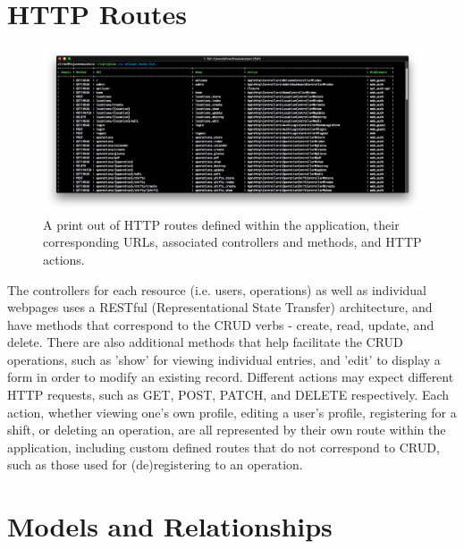 \section{HTTP Routes}

\begin{figure}[!ht]
    \includegraphics[width=1.0\textwidth]{Figures/routes}
    \caption{A print out of HTTP routes defined within the application, their corresponding URLs, associated controllers and methods, and HTTP actions.}
    \label{fig:methods}
\end{figure}

The controllers for each resource (i.e. users, operations) as well as individual webpages uses a RESTful (Representational State Transfer) architecture, and have methods that correspond to the CRUD verbs - create, read, update, and delete. There are also additional methods that help facilitate the CRUD operations, such as 'show' for viewing individual entries, and 'edit' to display a form in order to modify an existing record. Different actions may expect different HTTP requests, such as GET, POST, PATCH, and DELETE respectively. Each action, whether viewing one's own profile, editing a user's profile, registering for a shift, or deleting an operation, are all represented by their own route within the application, including custom defined routes that do not correspond to CRUD, such as those used for (de)registering to an operation. \cite{Laravel7} \cite{7539825}

\section{Models and Relationships}

